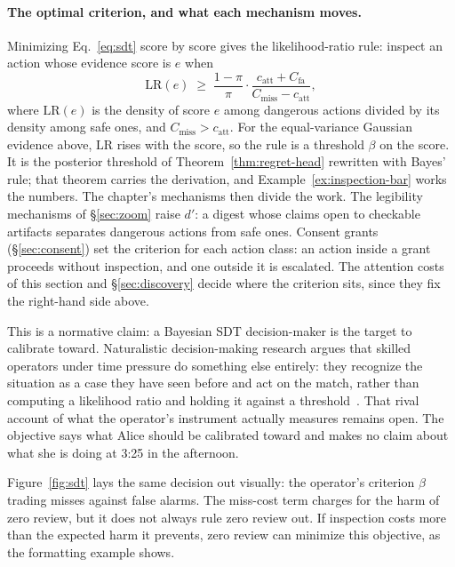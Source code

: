 \documentclass[11pt,a4paper]{article}
\theoremstyle{definition}
\theoremstyle{plain}
\begin{document}
\paragraph{The optimal criterion, and what each mechanism moves.} Minimizing
Eq.~\ref{eq:sdt} score by score gives the likelihood-ratio rule: inspect an
action whose evidence score is $e$ when
\[
\mathrm{LR}(e)\;\ge\;\frac{1-\pi}{\pi}\cdot
\frac{c_{\mathrm{att}}+C_{\text{fa}}}{C_{\text{miss}}-c_{\mathrm{att}}},
\]
where $\mathrm{LR}(e)$ is the density of score $e$ among dangerous actions
divided by its density among safe ones, and $C_{\text{miss}}>c_{\mathrm{att}}$.
For the equal-variance Gaussian evidence above, $\mathrm{LR}$ rises with the
score, so the rule is a threshold $\beta$ on the score. It is the posterior
threshold of Theorem~\ref{thm:regret-head} rewritten with Bayes' rule; that
theorem carries the derivation, and Example~\ref{ex:inspection-bar} works the
numbers. The chapter's mechanisms then divide the work. The legibility
mechanisms of \S\ref{sec:zoom} raise $d'$: a digest whose claims open to
checkable artifacts separates dangerous actions from safe ones. Consent grants
(\S\ref{sec:consent}) set the criterion for each action class: an action inside
a grant proceeds without inspection, and one outside it is escalated. The
attention costs of this section and \S\ref{sec:discovery} decide where the
criterion sits, since they fix the right-hand side above.



This is a normative claim: a Bayesian SDT decision-maker is the target to
calibrate toward. Naturalistic decision-making
research argues that skilled operators under time pressure do something else
entirely: they recognize the situation as a case they have seen before and act
on the match, rather than computing a likelihood ratio and holding it against a
threshold~. That rival account of what the operator's
instrument actually measures remains open. The objective says what Alice should
be calibrated toward and makes no claim about what she is doing at 3:25 in the
afternoon.

Figure~\ref{fig:sdt} lays the same decision out visually: the operator's criterion
$\beta$ trading misses against false alarms. The miss-cost term charges for the
harm of zero review, but it does not always rule zero review out. If inspection
costs more than the expected harm it prevents, zero review can minimize this
objective, as the formatting example shows.
\end{document}
